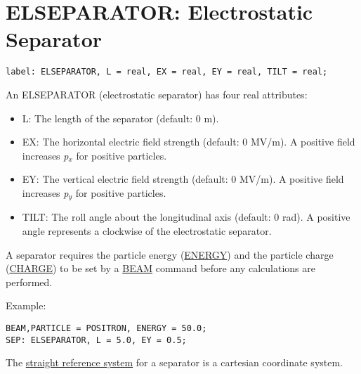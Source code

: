 
\section{ELSEPARATOR: Electrostatic Separator}

\begin{verbatim}
label: ELSEPARATOR, L = real, EX = real, EY = real, TILT = real;
\end{verbatim} 

An ELSEPARATOR (electrostatic separator) has four real attributes: 
\begin{itemize}
   \item L: The length of the separator (default: 0 m). 
   \item EX: The horizontal electric field strength (default: 0 MV/m). A
     positive field increases \textit{p$_x$} for positive particles.  
   \item EY: The vertical electric field strength (default: 0 MV/m). A
     positive field increases \textit{p$_y$} for positive particles.  
   \item TILT: The roll angle about the longitudinal axis (default: 0
     rad). A positive angle represents a clockwise of the electrostatic
     separator.  
\end{itemize} 

A separator requires the particle energy
(\href{beam.html#energy}{ENERGY}) and the particle charge
(\href{beam.html#charge}{CHARGE}) to be set by a \href{beam.html}{BEAM}
command before any calculations are performed.  

Example: 
\begin{verbatim}
BEAM,PARTICLE = POSITRON, ENERGY = 50.0;
SEP: ELSEPARATOR, L = 5.0, EY = 0.5;
\end{verbatim} 

The \href{local_system.html#straight}{straight reference system} for a
separator is a cartesian coordinate system.   

